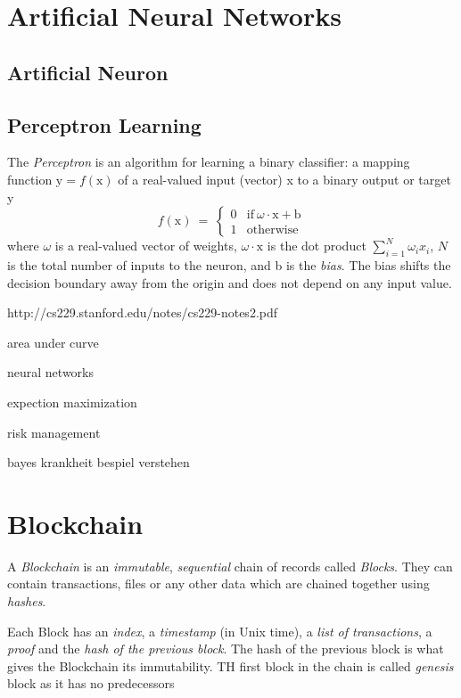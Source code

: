 \documentclass[11pt]{article}
\theoremstyle{plain}
\theoremstyle{definition}
\begin{document}
\section{Artificial Neural Networks}

\subsection{Artificial Neuron}

\subsection{Perceptron Learning}
The \textit{Perceptron} is an algorithm for learning a binary classifier: a mapping function $\text{y}=f(\text{x})$ of a real-valued input (vector) x to a binary output or target y
\begin{equation}
f(\text{x}) \ = \ \begin{cases}
0 & \text{if} \ \omega \cdot \text{x} + \text{b} \\
1 & \text{otherwise}
\end{cases}
\end{equation}
where $\omega$ is a real-valued vector of weights, $\omega \cdot \text{x}$ is the dot product $\sum_{i=1}^N \omega_i x_i$, $N$ is the total number of inputs to the neuron, and b is the \textit{bias}. The bias shifts the decision boundary away from the origin and does not depend on any input value.


http://cs229.stanford.edu/notes/cs229-notes2.pdf

area under curve

neural networks

expection maximization

risk management

bayes krankheit bespiel verstehen


\section{Blockchain}
A \textit{Blockchain} is an \textit{immutable}, \textit{sequential} chain of records called \textit{Blocks}. They can contain transactions, files or any other data which are chained together using \textit{hashes}.

Each Block has an \textit{index}, a \textit{timestamp} (in Unix time), a \textit{list of transactions}, a \textit{proof} and the \textit{hash of the previous block}. The hash of the previous block is what gives the Blockchain its immutability. TH first block in the chain is called \textit{genesis} block as it has no predecessors
\end{document}
